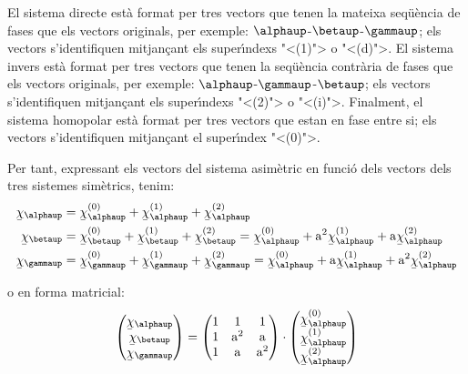  
 El sistema directe est\`{a} format per tres
vectors que tenen la mateixa seq\"{u}\`{e}ncia de fases que els vectors
originals, per exemple: $\alphaup$-$\betaup$-$\gammaup$; els vectors
s'identifiquen mitjan\c{c}ant els super\'{\i}ndexs {"<}(1){">} o {"<}(d){">}. El sistema
invers est\`{a} format per tres vectors que tenen la seq\"{u}\`{e}ncia contr\`{a}ria
de fases que els vectors originals, per exemple:
$\alphaup$-$\gammaup$-$\betaup$; els vectors s'identifiquen mitjan\c{c}ant els
super\'{\i}ndexs {"<}(2){">} o {"<}(i){">}. Finalment, el sistema homopolar est\`{a}
format per tres vectors que estan en fase entre si; els vectors
s'identifiquen mitjan\c{c}ant el super\'{\i}ndex {"<}(0){">}.

Per tant, expressant els vectors del sistema asim\`{e}tric en funci\'{o}
dels vectors dels tres sistemes sim\`{e}trics, tenim:
\begin{subequations}
\begin{align}
   \cmplx{\chi}_\alphaup &= \cmplx{\chi}_\alphaup\ap{(0)}  +
   \cmplx{\chi}_\alphaup\ap{(1)} + \cmplx{\chi}_\alphaup\ap{(2)} \label{eq:c_sim_a}\\
   \cmplx{\chi}_\betaup &= \cmplx{\chi}_\betaup\ap{(0)} + \cmplx{\chi}_\betaup\ap{(1)} +
   \cmplx{\chi}_\betaup\ap{(2)}  =  \cmplx{\chi}_\alphaup\ap{(0)} + \au^2
   \cmplx{\chi}_\alphaup\ap{(1)} + \au \cmplx{\chi}_\alphaup\ap{(2)} \label{eq:c_sim_b}\\
   \cmplx{\chi}_\gammaup &= \cmplx{\chi}_\gammaup\ap{(0)} + \cmplx{\chi}_\gammaup\ap{(1)} +
   \cmplx{\chi}_\gammaup\ap{(2)}  = \cmplx{\chi}_\alphaup\ap{(0)} + \au
   \cmplx{\chi}_\alphaup\ap{(1)} + \au^2 \cmplx{\chi}_\alphaup\ap{(2)} \label{eq:c_sim_c}
\end{align}
\end{subequations}

o en forma matricial:
\begin{equation}
   \begin{pmatrix}
     \cmplx{\chi}_\alphaup \\
     \cmplx{\chi}_\betaup \\
     \cmplx{\chi}_\gammaup
   \end{pmatrix} =
   \begin{pmatrix}
     1 & 1 & 1 \\
     1 & \au^2 & \au\\
     1 & \au & \au^2
   \end{pmatrix} \cdot
   \begin{pmatrix}
     \cmplx{\chi}_\alphaup\ap{(0)} \\
     \cmplx{\chi}_\alphaup\ap{(1)} \\
     \cmplx{\chi}_\alphaup\ap{(2)}
   \end{pmatrix}
\end{equation}

